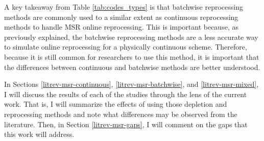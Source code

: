 A key takeaway from Table \ref{tab:codes_types} is that batchwise reprocessing methods are commonly used to a similar extent as continuous reprocessing methods to handle MSR online reprocessing.
This is important because, as previously explained, the batchwise reprocessing methods are a less accurate way to simulate online reprocessing for a physically continuous scheme.
Therefore, because it is still common for researchers to use this method, it is important that the differences between continuous and batchwise methods are better understood.







In Sections \ref{litrev-msr-continuous}, \ref{litrev-msr-batchwise}, and \ref{litrev-msr-mixed}, I will discuss the results of each of the studies through the lens of the current work. That is, I will summarize the effects of using those depletion and reprocessing methods and note what differences may be observed from the literature. Then, in Section \ref{litrev-msr-gaps}, I will comment on the gaps that this work will address.

